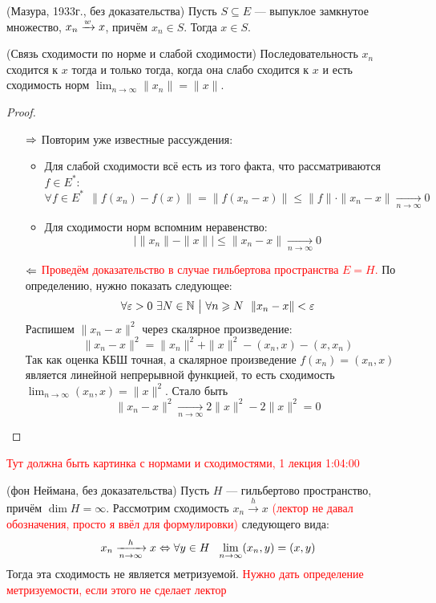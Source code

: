 \begin{theorem} (Мазура, 1933г., без доказательства)
	Пусть $S \subseteq E$ --- выпуклое замкнутое множество, $x_n \xrightarrow{w} x$, причём $x_n \in S$. Тогда $x \in S$.
\end{theorem}

\begin{proposition} (Связь сходимости по норме и слабой сходимости)
	Последовательность $x_n$ сходится к $x$ тогда и только тогда, когда она слабо сходится к $x$ и есть сходимость норм $\lim_{n \to \infty} \|x_n\| = \|x\|$.
\end{proposition}

\begin{proof}~
	\begin{itemize}
		\item[$\Rightarrow$] Повторим уже известные рассуждения:
		\begin{itemize}
			\item Для слабой сходимости всё есть из того факта, что рассматриваются $f \in E^*$:
			\[
				\forall f \in E^*\ \ \|f(x_n) - f(x)\| = \|f(x_n - x)\| \le \|f\| \cdot \|x_n - x\| \xrightarrow[n \to \infty]{} 0
			\]
			
			\item Для сходимости норм вспомним неравенство:
			\[
				\big|\|x_n\| - \|x\|\big| \le \|x_n - x\| \xrightarrow[n \to \infty]{} 0
			\]
		\end{itemize}
		
		\item[$\Leftarrow$] \textcolor{red}{Проведём доказательство в случае гильбертова пространства $E = H$.} По определению, нужно показать следующее:
		\[
			\forall \varepsilon > 0\ \exists N \in \mathbb{N} \ \big|\  \forall n \geqslant N\ \ \|x_n - x\| < \varepsilon
		\]
		Распишем $\|x_n - x\|^2$ через скалярное произведение:
		\[
			\|x_n - x\|^2 = \|x_n\|^2 + \|x\|^2 - (x_n, x) - (x, x_n)
		\]
		Так как оценка КБШ точная, а скалярное произведение $f(x_n) = (x_n, x)$ является линейной непрерывной функцией, то есть сходимость $\lim_{n \to \infty} (x_n, x) = \|x\|^2$. Стало быть
		\[
			\|x_n - x\|^2 \xrightarrow[n \to \infty]{} 2\|x\|^2 - 2\|x\|^2 = 0
		\]
	\end{itemize}
\end{proof}

\textcolor{red}{Тут должна быть картинка с нормами и сходимостями, 1 лекция 1:04:00}

\begin{theorem} (фон Неймана, без доказательства)
	Пусть $H$ --- гильбертово пространство, причём $\dim H = \infty$. Рассмотрим сходимость $x_n \xrightarrow{h} x$ \textcolor{red}{(лектор не давал обозначения, просто я ввёл для формулировки)} следующего вида:
	\[
		x_n \xrightarrow[n \to \infty]{h} x \Leftrightarrow \forall y \in H\ \ \lim_{n \to \infty} (x_n, y) = (x, y)
	\]
	Тогда эта сходимость не является метризуемой. \textcolor{red}{Нужно дать определение метризуемости, если этого не сделает лектор}
\end{theorem}


